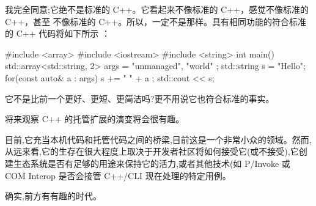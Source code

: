 我完全同意;它绝不是标准的 C++。它看起来不像标准的 C++，感觉不像标准的 C++，甚至
不像标准的 C++。所以，一定不是那样。具有相同功能的符合标准的 C++ 代码将如下所示
：

\begin{cpp}
#include <array>
#include <iostream>
#include <string>
int main() {
  std::array<std::string, 2> args = { "unmanaged", "world" };
  std::string s = "Hello";
  for(const auto& a : args) {
    s += " " + a ;
  }
  std::cout << s;
}
\end{cpp}

它不是比前一个更好、更短、更简洁吗?更不用说它也符合标准的事实。

将来观察 C++ 的托管扩展的演变将会很有趣。

目前,它充当本机代码和托管代码之间的桥梁,目前这是一个非常小众的领域。然而,从远来看,它的生存在很大程度上取决于开发者社区将如何接受它(或不接受),它创建生态系统是否有足够的用途来保持它的活力,或者其他技术(如 P/Invoke 或 COM Interop 是否会接管 C++/CLI 现在处理的特定用例。

确实,前方有有趣的时代。



















